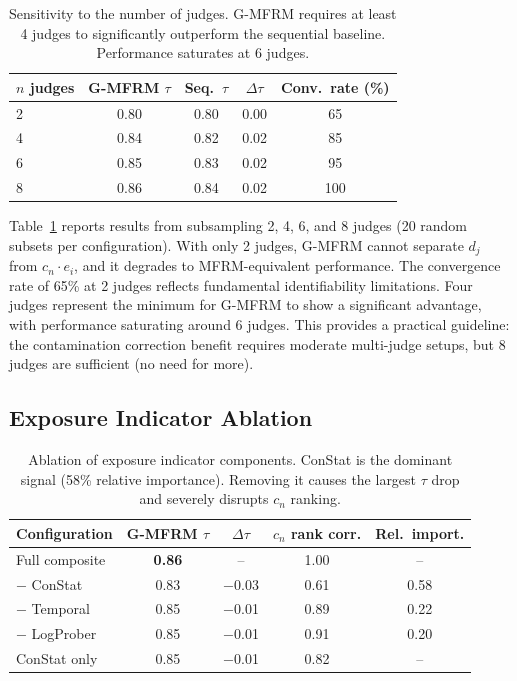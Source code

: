 \documentclass[11pt]{article}
\begin{document}
\begin{table}[t]
\centering
\caption{Sensitivity to the number of judges. G-MFRM requires at least 4 judges to significantly outperform the sequential baseline. Performance saturates at 6 judges.}
\label{tab:judge_count}
\begin{tabular}{lcccc}
\toprule
$n$ judges & G-MFRM $\tau$ & Seq.\ $\tau$ & $\Delta\tau$ & Conv.\ rate (\%) \\
\midrule
2 & 0.80 & 0.80 & 0.00 & 65 \\
4 & 0.84 & 0.82 & 0.02 & 85 \\
6 & 0.85 & 0.83 & 0.02 & 95 \\
8 & 0.86 & 0.84 & 0.02 & 100 \\
\bottomrule
\end{tabular}
\end{table}

Table~\ref{tab:judge_count} reports results from subsampling 2, 4, 6, and 8 judges (20 random subsets per configuration). With only 2 judges, G-MFRM cannot separate $d_j$ from $c_n \cdot e_i$, and it degrades to MFRM-equivalent performance. The convergence rate of 65\% at 2 judges reflects fundamental identifiability limitations. Four judges represent the minimum for G-MFRM to show a significant advantage, with performance saturating around 6 judges. This provides a practical guideline: the contamination correction benefit requires moderate multi-judge setups, but 8 judges are sufficient (no need for more).

\subsection{Exposure Indicator Ablation}
\label{sec:ablation}

\begin{table}[t]
\centering
\caption{Ablation of exposure indicator components. ConStat is the dominant signal (58\% relative importance). Removing it causes the largest $\tau$ drop and severely disrupts $c_n$ ranking.}
\label{tab:ablation}
\begin{tabular}{lcccc}
\toprule
Configuration & G-MFRM $\tau$ & $\Delta\tau$ & $c_n$ rank corr. & Rel.\ import. \\
\midrule
Full composite & \textbf{0.86} & -- & 1.00 & -- \\
$-$ ConStat & 0.83 & $-$0.03 & 0.61 & 0.58 \\
$-$ Temporal & 0.85 & $-$0.01 & 0.89 & 0.22 \\
$-$ LogProber & 0.85 & $-$0.01 & 0.91 & 0.20 \\
ConStat only & 0.85 & $-$0.01 & 0.82 & -- \\
\bottomrule
\end{tabular}
\end{table}
\end{document}
